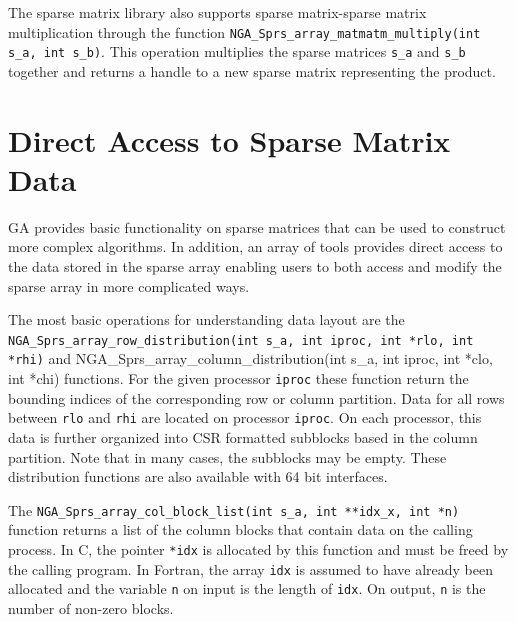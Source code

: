 The sparse matrix library also supports sparse matrix-sparse matrix
multiplication through the function \texttt{NGA\_Sprs\_array\_matmatm\_multiply(int
s\_a, int s\_b)}. This operation multiplies the sparse matrices \texttt{s\_a}
and \texttt{s\_b} together and returns a handle to a new sparse matrix
representing the product.

\section{Direct Access to Sparse Matrix Data}

GA provides basic functionality on sparse matrices that can be used to construct
more complex algorithms. In addition, an array of tools provides direct access
to the data stored in the sparse array enabling users to both access and modify
the sparse array in more complicated ways.

The most basic operations for understanding data layout are the
\texttt{NGA\_Sprs\_array\_row\_distribution(int s\_a, int iproc, int *rlo, int
*rhi)} and {NGA\_Sprs\_array\_column\_distribution(int s\_a, int iproc, int *clo, int
*chi)} functions. For the given processor \texttt{iproc} these function return
the bounding indices of the corresponding row or column partition. Data for all
rows between \texttt{rlo} and \texttt{rhi} are located on processor
\texttt{iproc}. On each processor, this data is further organized into CSR
formatted subblocks based in the column partition. Note that in many cases, the
subblocks may be empty. These distribution functions are also available with 64 bit
interfaces.


The \texttt{NGA\_Sprs\_array\_col\_block\_list(int s\_a, int **idx\_x, int *n)}
function returns a list of the column blocks that contain data on the calling
process. In C, the pointer \texttt{*idx} is allocated by this function and must
be freed by the calling program. In Fortran, the array \texttt{idx} is assumed
to have already been allocated and the variable \texttt{n} on input is the
length of \texttt{idx}. On output, \texttt{n} is the number of non-zero blocks.

